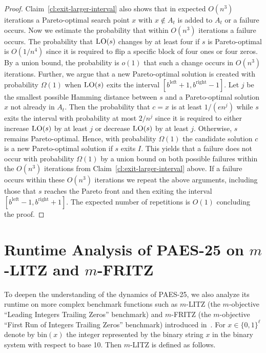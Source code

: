 \documentclass[
sigconf = false, %
review = false, %
screen = true, %
anonymous = true, %
format=acmsmall
]{acmart}
\newcommand{\LO}{\textsc{LO}\xspace}                      %
\newcommand{\PAES}{PAES-25\xspace}
\begin{document}
\begin{proof}
    Claim~\ref{cl:exit-larger-interval} also shows that in expected $O(n^3)$ iterations a Pareto-optimal search point $x$ with $x \notin A_t$ is added to $A_t$ or a failure occurs. Now we estimate the probability that within $O(n^3)$ iterations a failure occurs. The probability that $\LO(s)$ changes by at least four if $s$ is Pareto-optimal is $O(1/n^4)$ since it is required to flip a specific block of four ones or four zeros. By a union bound, the probability is $o(1)$ that such a change occurs in $O(n^3)$ iterations. Further, we argue that a new Pareto-optimal solution is created with probability $\Omega(1)$ when $\LO(s)$ exits the interval $[b^{\text{left}}+1,b^{\text{right}}-1]$. Let $j$ be the smallest possible Hamming distance between $s$ and a Pareto-optimal solution $x$ not already in $A_t$. Then the probability that $c=x$ is at least $1/(en^j)$ while $s$ exits the interval with probability at most $2/n^j$ since it is required to either increase $\LO(s)$ by at least $j$ or decrease $\LO(s)$ by at least $j$. Otherwise, $s$ remains Pareto-optimal. Hence, with probability $\Omega(1)$ the candidate solution $c$ is a new Pareto-optimal solution if $s$ exits $I$. This yields that a failure does not occur with probability $\Omega(1)$ by a union bound on both possible failures within the $O(n^3)$ iterations from Claim~\ref{cl:exit-larger-interval} above. If a failure occurs within these $O(n^3)$ iterations we repeat the above arguments, including those that $s$ reaches the Pareto front and then exiting the interval $[b^{\text{left}}-1,b^{\text{right}}+1]$. The expected number of repetitions is $O(1)$ concluding the proof. 
\end{proof}


\section{Runtime Analysis of \PAES on $m$-LITZ and $m$-FRITZ}
To deepen the understanding of the dynamics of \PAES, we also analyze its runtime on more complex benchmark functions such as $m$-LITZ (the $m$-objective “Leading Integers Trailing Zeros” benchmark) and $m$-FRITZ (the $m$-objective “First Run of Integers Trailing Zeros” benchmark) introduced in~\cite{Knowles2025}. For $x \in \{0,1\}^\ell$ denote by $\text{bin}(x)$ the integer represented by the binary string $x$ in the binary system with respect to base 10. Then $m$-LITZ is defined as follows. 
\end{document}
